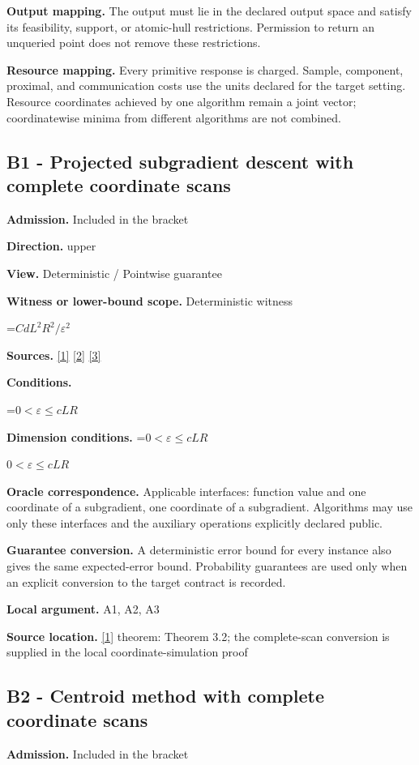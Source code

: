 \documentclass[10pt,a4paper]{article}
\newcommand{\AtlasMath}[1]{\par\begingroup\centering\setbox0=\hbox{$\displaystyle #1$}\ifdim\wd0>1.4\linewidth\typeout{ATLAS WIDE FORMULA: \the\wd0}\fi\ifdim\wd0>\linewidth\resizebox{\linewidth}{!}{\box0}\else\box0\fi\par\endgroup}
\newcommand{\AtlasInlineMath}[1]{\begingroup\setbox0=\hbox{$#1$}\ifdim\wd0>.4\linewidth\endgroup\AtlasMath{#1}\else\endgroup$#1$\fi}
\begin{document}
\textbf{Output mapping.} The output must lie in the declared output space and satisfy its feasibility, support, or atomic-hull restrictions. Permission to return an unqueried point does not remove these restrictions.

\textbf{Resource mapping.} Every primitive response is charged. Sample, component, proximal, and communication costs use the units declared for the target setting. Resource coordinates achieved by one algorithm remain a joint vector; coordinatewise minima from different algorithms are not combined.

\subsection{B1 - Projected subgradient descent with complete coordinate scans}
\textbf{Admission.} Included in the bracket

\textbf{Direction.} upper

\textbf{View.} Deterministic / Pointwise guarantee

\textbf{Witness or lower-bound scope.} Deterministic witness

\AtlasMath{CdL^2R^2/\varepsilon^2}
\textbf{Sources.} \href{https://arxiv.org/pdf/1405.4980}{[1]} \href{https://www2.isye.gatech.edu/~nemirovs/MOR_AccuracyCertificates.pdf}{[2]} \href{https://arxiv.org/pdf/2609.20701}{[3]}

\textbf{Conditions.} 
\AtlasMath{0<\varepsilon\le cLR}


\textbf{Dimension conditions.} \AtlasInlineMath{0<\varepsilon\le cLR}

\textbf{Oracle correspondence.} Applicable interfaces: function value and one coordinate of a subgradient, one coordinate of a subgradient. Algorithms may use only these interfaces and the auxiliary operations explicitly declared public.

\textbf{Guarantee conversion.} A deterministic error bound for every instance also gives the same expected-error bound. Probability guarantees are used only when an explicit conversion to the target contract is recorded.

\textbf{Local argument.} A1, A2, A3

\textbf{Source location.} \href{https://arxiv.org/pdf/1405.4980}{[1]} theorem: Theorem 3.2; the complete-scan conversion is supplied in the local coordinate-simulation proof

\subsection{B2 - Centroid method with complete coordinate scans}
\textbf{Admission.} Included in the bracket
\end{document}
